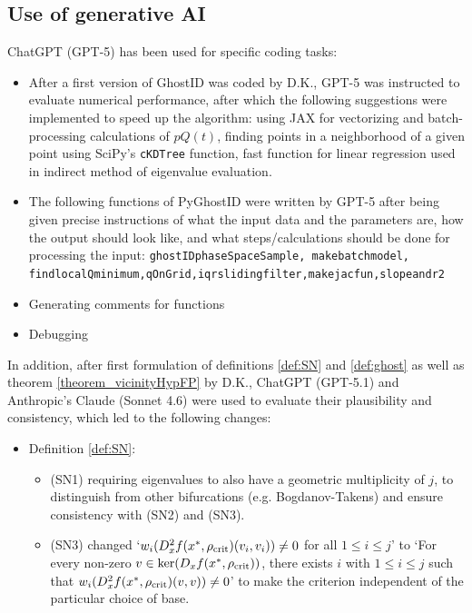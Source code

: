 \documentclass{article}
\theoremstyle{definition}
\begin{document}
\begin{refsection}
\FloatBarrier
\section{Use of generative AI}\label{subsec:genAIuse}

ChatGPT (GPT-5) has been used for specific coding tasks:
\begin{itemize}
    \item After a first version of GhostID was coded by D.K., GPT-5 was instructed to evaluate numerical performance, after which the following suggestions were implemented to speed up the algorithm: using JAX for vectorizing and batch-processing calculations of $pQ(t)$, finding points in a neighborhood of a given point using SciPy's {\tt cKDTree} function, fast function for linear regression used in indirect method of eigenvalue evaluation.
    \item The following functions of PyGhostID were written by GPT-5 after being given precise instructions of what the input data and the parameters are, how the output should look like, and what steps/calculations should be done for processing the input: 
    {\tt ghostID\textunderscore phaseSpaceSample, make\textunderscore batch\textunderscore model, find\textunderscore local\textunderscore Qminimum,qOnGrid,iqr\textunderscore sliding\textunderscore filter,make\textunderscore jacfun,slope\textunderscore and\textunderscore r2}
    \item Generating comments for functions
    \item Debugging
\end{itemize}

In addition, after first formulation of definitions \ref{def:SN} and \ref{def:ghost} as well as theorem \ref{theorem_vicinityHypFP} by D.K., ChatGPT (GPT-5.1) and Anthropic's Claude (Sonnet 4.6) were used to evaluate their plausibility and consistency, which led to the following changes:
\begin{itemize}
    \item Definition \ref{def:SN}: 
    \begin{itemize}
        \item (SN1) requiring eigenvalues to also have a geometric multiplicity of $j$, to distinguish from other bifurcations (e.g. Bogdanov-Takens) and ensure consistency with (SN2) and (SN3).
        \item (SN3) changed `$w_i(D_x^2f(x^*,\rho_{\textnormal{crit}})(v_i,v_i))\neq 0$ for all $1\leq i \leq j$' to `For every non-zero $v\in \ker(D_xf(x^*,\rho_{\textnormal{crit}}))$, there exists $i$ with $1\leq i \leq j$ such that $w_i(D_x^2f(x^*,\rho_{\textnormal{crit}})(v,v))\neq 0$' to make the criterion independent of the particular choice of base.
    \end{itemize}
\end{itemize}


\end{refsection}
\end{document}

